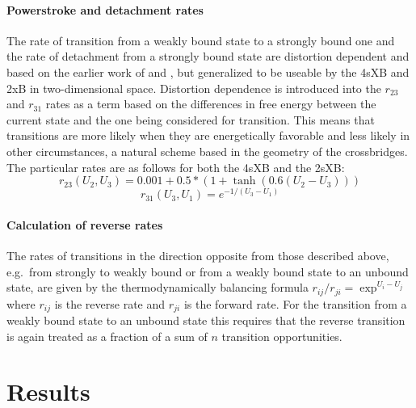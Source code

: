 \documentclass[]{article}
\begin{document}
\paragraph{Powerstroke and detachment rates} %
The rate of transition from a weakly bound state to a strongly bound one and the rate of detachment from a strongly bound state are distortion dependent and based on the earlier work of \citet{Pate:1989:p181} and \citet{Tanner:2007:pe115}, but generalized to be useable by the 4sXB and 2xB in two-dimensional space. %
Distortion dependence is introduced into the $r_{23}$ and $r_{31}$ rates as a term based on the differences in free energy between the current state and the one being considered for transition. 
This means that transitions are more likely when they are energetically favorable and less likely in other circumstances, a natural scheme based in the geometry of the crossbridges.
The particular rates are as follows for both the 4sXB and the 2sXB:
$$r_{23}(U_2, U_3) = 0.001 + 0.5 * (1 + \tanh(0.6 (U_2 - U_3))) $$
$$r_{31}(U_3, U_1) = e^{-1 / (U_3 - U_1)}$$

\paragraph{Calculation of reverse rates} %
The rates of transitions in the direction opposite from those described above, e.g.\ from strongly to weakly bound or from a weakly bound state to an unbound state, are given by the thermodynamically balancing formula $r_{ij}/r_{ji}=\exp^{U_i-U_j}$ where $r_{ij}$ is the reverse rate and $r_{ji}$ is the forward rate.
For the transition from a weakly bound state to an unbound state this requires that the reverse transition is again treated as a fraction of a sum of $n$ transition opportunities.



\section{Results} %
\end{document}
